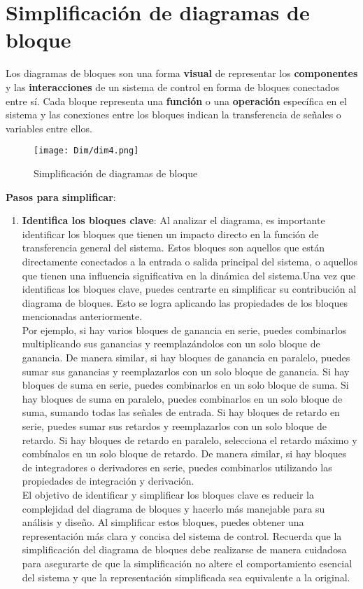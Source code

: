 \documentclass[
	12pt, %
	fleqn, %
	a4paper, %
	oneside, %
]{LegrandOrangeBook}
\begin{document}
\section{Simplificación de diagramas de bloque}
Los diagramas de bloques son una forma \textbf{visual} de representar los \textbf{componentes} y las \textbf{interacciones} de un sistema de control en forma de bloques conectados entre sí. Cada bloque representa una \textbf{función} o una \textbf{operación} específica en el sistema y las conexiones entre los bloques indican la transferencia de señales o variables entre ellos.
\begin{figure}[H]
\centering
\texttt{[image: Dim/dim4.png]}
\caption{Simplificación de diagramas de bloque}
\end{figure}
\textbf{Pasos para simplificar}:
\begin{enumerate}
\item \textbf{Identifica los bloques clave}: Al analizar el diagrama, es importante identificar los bloques que tienen un impacto directo en la función de transferencia general del sistema. Estos bloques son aquellos que están directamente conectados a la entrada o salida principal del sistema, o aquellos que tienen una influencia significativa en la dinámica del sistema.Una vez que identificas los bloques clave, puedes centrarte en simplificar su contribución al diagrama de bloques. Esto se logra aplicando las propiedades de los bloques mencionadas anteriormente.\\
Por ejemplo, si hay varios bloques de ganancia en serie, puedes combinarlos multiplicando sus ganancias y reemplazándolos con un solo bloque de ganancia. De manera similar, si hay bloques de ganancia en paralelo, puedes sumar sus ganancias y reemplazarlos con un solo bloque de ganancia. Si hay bloques de suma en serie, puedes combinarlos en un solo bloque de suma. Si hay bloques de suma en paralelo, puedes combinarlos en un solo bloque de suma, sumando todas las señales de entrada. Si hay bloques de retardo en serie, puedes sumar sus retardos y reemplazarlos con un solo bloque de retardo. Si hay bloques de retardo en paralelo, selecciona el retardo máximo y combínalos en un solo bloque de retardo. De manera similar, si hay bloques de integradores o derivadores en serie, puedes combinarlos utilizando las propiedades de integración y derivación.\\ 
El objetivo de identificar y simplificar los bloques clave es reducir la complejidad del diagrama de bloques y hacerlo más manejable para su análisis y diseño. Al simplificar estos bloques, puedes obtener una representación más clara y concisa del sistema de control. Recuerda que la simplificación del diagrama de bloques debe realizarse de manera cuidadosa para asegurarte de que la simplificación no altere el comportamiento esencial del sistema y que la representación simplificada sea equivalente a la original.

\end{enumerate}
\end{document}

